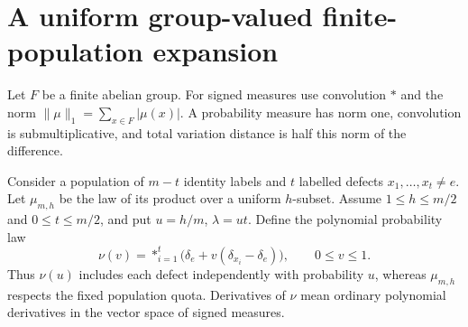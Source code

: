 \documentclass[11pt]{article}
\theoremstyle{remark}\newtheorem{remark}[theorem]{Remark}
\begin{document}
\section{A uniform group-valued finite-population expansion}\label{sec:expansion}

Let $F$ be a finite abelian group. For signed measures use convolution $*$ and the norm
$\|\mu\|_1=\sum_{x\in F}|\mu(x)|$. A probability measure has norm one, convolution is submultiplicative, and total variation distance is half this norm of the difference.

Consider a population of $m-t$ identity labels and $t$ labelled defects $x_1,\ldots,x_t\ne e$. Let $\mu_{m,h}$ be the law of its product over a uniform $h$-subset. Assume $1\le h\le m/2$ and $0\le t\le m/2$, and put $u=h/m$, $\lambda=ut$. Define the polynomial probability law
\begin{equation}\label{eq:nu}
 \nu(v)=\mathop{*}_{i=1}^t\bigl(\delta_e+v(\delta_{x_i}-\delta_e)\bigr),\qquad0\le v\le1.
\end{equation}
Thus $\nu(u)$ includes each defect independently with probability $u$, whereas $\mu_{m,h}$ respects the fixed population quota. Derivatives of $\nu$ mean ordinary polynomial derivatives in the vector space of signed measures.
\end{document}
